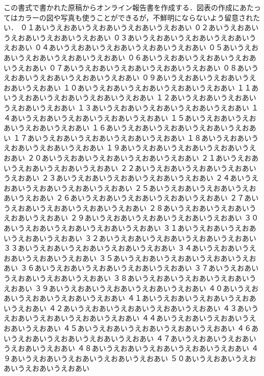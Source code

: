 \documentclass[a4j]{article}
\begin{document}
\msnormalsize
この書式で書かれた原稿からオンライン報告書を作成する．図表の作成にあたってはカラーの図や写真も使うことができるが，不鮮明にならないよう留意されたい．
\newpage
\msnormalsize
\noindent%
０１あいうえおあいうえおあいうえおあいうえおあい
０２あいうえおあいうえおあいうえおあいうえおあい
０３あいうえおあいうえおあいうえおあいうえおあい
０４あいうえおあいうえおあいうえおあいうえおあい
０５あいうえおあいうえおあいうえおあいうえおあい
０６あいうえおあいうえおあいうえおあいうえおあい
０７あいうえおあいうえおあいうえおあいうえおあい
０８あいうえおあいうえおあいうえおあいうえおあい
０９あいうえおあいうえおあいうえおあいうえおあい
１０あいうえおあいうえおあいうえおあいうえおあい
１１あいうえおあいうえおあいうえおあいうえおあい
１２あいうえおあいうえおあいうえおあいうえおあい
１３あいうえおあいうえおあいうえおあいうえおあい
１４あいうえおあいうえおあいうえおあいうえおあい
１５あいうえおあいうえおあいうえおあいうえおあい
１６あいうえおあいうえおあいうえおあいうえおあい
１７あいうえおあいうえおあいうえおあいうえおあい
１８あいうえおあいうえおあいうえおあいうえおあい
１９あいうえおあいうえおあいうえおあいうえおあい
２０あいうえおあいうえおあいうえおあいうえおあい
２１あいうえおあいうえおあいうえおあいうえおあい
２２あいうえおあいうえおあいうえおあいうえおあい
２３あいうえおあいうえおあいうえおあいうえおあい
２４あいうえおあいうえおあいうえおあいうえおあい
２５あいうえおあいうえおあいうえおあいうえおあい
２６あいうえおあいうえおあいうえおあいうえおあい
２７あいうえおあいうえおあいうえおあいうえおあい
２８あいうえおあいうえおあいうえおあいうえおあい
２９あいうえおあいうえおあいうえおあいうえおあい
３０あいうえおあいうえおあいうえおあいうえおあい
３１あいうえおあいうえおあいうえおあいうえおあい
３２あいうえおあいうえおあいうえおあいうえおあい
３３あいうえおあいうえおあいうえおあいうえおあい
３４あいうえおあいうえおあいうえおあいうえおあい
３５あいうえおあいうえおあいうえおあいうえおあい
３６あいうえおあいうえおあいうえおあいうえおあい
３７あいうえおあいうえおあいうえおあいうえおあい
３８あいうえおあいうえおあいうえおあいうえおあい
３９あいうえおあいうえおあいうえおあいうえおあい
４０あいうえおあいうえおあいうえおあいうえおあい
４１あいうえおあいうえおあいうえおあいうえおあい
４２あいうえおあいうえおあいうえおあいうえおあい
４３あいうえおあいうえおあいうえおあいうえおあい
４４あいうえおあいうえおあいうえおあいうえおあい
４５あいうえおあいうえおあいうえおあいうえおあい
４６あいうえおあいうえおあいうえおあいうえおあい
４７あいうえおあいうえおあいうえおあいうえおあい
４８あいうえおあいうえおあいうえおあいうえおあい
４９あいうえおあいうえおあいうえおあいうえおあい
５０あいうえおあいうえおあいうえおあいうえおあい


\begin{spacing}{1.0}

\end{spacing}
\end{document}
